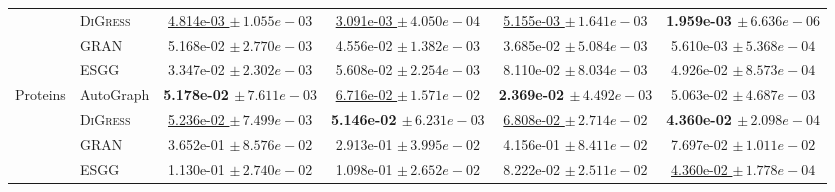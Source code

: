 {\begin{tabular}{llcccc}
 & \textsc{DiGress} & \underline{4.814e-03 $\pm\,\scriptstyle{1.055e-03}$} & \underline{3.091e-03 $\pm\,\scriptstyle{4.050e-04}$} & \underline{5.155e-03 $\pm\,\scriptstyle{1.641e-03}$} & \textbf{1.959e-03 $\pm\,\scriptstyle{6.636e-06}$} \\
 & GRAN & 5.168e-02 $\pm\,\scriptstyle{2.770e-03}$ & 4.556e-02 $\pm\,\scriptstyle{1.382e-03}$ & 3.685e-02 $\pm\,\scriptstyle{5.084e-03}$ & 5.610e-03 $\pm\,\scriptstyle{5.368e-04}$ \\
 & ESGG & 3.347e-02 $\pm\,\scriptstyle{2.302e-03}$ & 5.608e-02 $\pm\,\scriptstyle{2.254e-03}$ & 8.110e-02 $\pm\,\scriptstyle{8.034e-03}$ & 4.926e-02 $\pm\,\scriptstyle{8.573e-04}$ \\
\midrule
Proteins & AutoGraph & \textbf{5.178e-02 $\pm\,\scriptstyle{7.611e-03}$} & \underline{6.716e-02 $\pm\,\scriptstyle{1.571e-02}$} & \textbf{2.369e-02 $\pm\,\scriptstyle{4.492e-03}$} & 5.063e-02 $\pm\,\scriptstyle{4.687e-03}$ \\
 & \textsc{DiGress} & \underline{5.236e-02 $\pm\,\scriptstyle{7.499e-03}$} & \textbf{5.146e-02 $\pm\,\scriptstyle{6.231e-03}$} & \underline{6.808e-02 $\pm\,\scriptstyle{2.714e-02}$} & \textbf{4.360e-02 $\pm\,\scriptstyle{2.098e-04}$} \\
 & GRAN & 3.652e-01 $\pm\,\scriptstyle{8.576e-02}$ & 2.913e-01 $\pm\,\scriptstyle{3.995e-02}$ & 4.156e-01 $\pm\,\scriptstyle{8.411e-02}$ & 7.697e-02 $\pm\,\scriptstyle{1.011e-02}$ \\
 & ESGG & 1.130e-01 $\pm\,\scriptstyle{2.740e-02}$ & 1.098e-01 $\pm\,\scriptstyle{2.652e-02}$ & 8.222e-02 $\pm\,\scriptstyle{2.511e-02}$ & \underline{4.360e-02 $\pm\,\scriptstyle{1.778e-04}$} \\
\bottomrule
\end{tabular}}